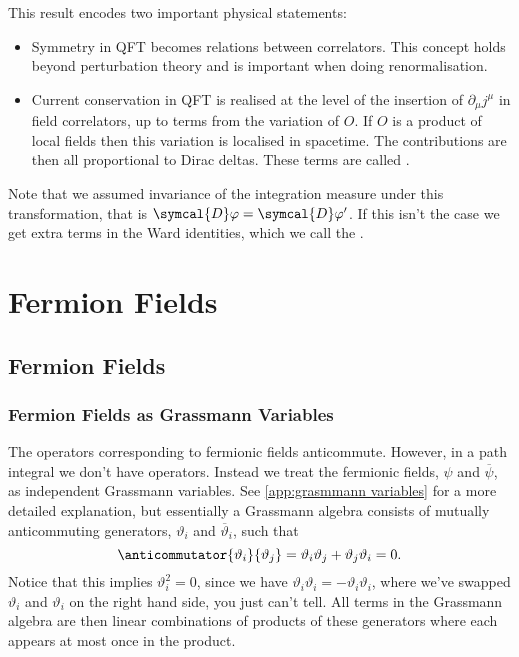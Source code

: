 \documentclass[fleqn]{NotesClass}
\newcommand{\DL}[1]{\symcal{D}#1}
\newcommand{\diracadjoint}[1]{\overbar{#1}}
\begin{document}
    This result encodes two important physical statements:
    \begin{itemize}
        \item Symmetry in QFT becomes relations between correlators. This concept holds beyond perturbation theory and is important when doing renormalisation.
        \item Current conservation in QFT is realised at the level of the insertion of \(\partial_\mu j^\mu\) in field correlators, up to terms from the variation of \(O\).
        If \(O\) is a product of local fields then this variation is localised in spacetime.
        The contributions are then all proportional to Dirac deltas.
        These terms are called .
    \end{itemize}
    Note that we assumed invariance of the integration measure under this transformation, that is \(\DL{\varphi} = \DL{\varphi'}\).
    If this isn't the case we get extra terms in the Ward identities, which we call the .
    
    \part{Fermion Fields}
    \chapter{Fermion Fields}
    \section{Fermion Fields as Grassmann Variables}
    The operators corresponding to fermionic fields anticommute.
    However, in a path integral we don't have operators.
    Instead we treat the fermionic fields, \(\psi\) and \(\diracadjoint{\psi}\), as independent Grassmann variables.
    See \cref{app:grasmmann variables} for a more detailed explanation, but essentially a Grassmann algebra consists of mutually anticommuting generators, \(\vartheta_i\) and \(\diracadjoint{\vartheta}_i\), such that
    \begin{equation}
        \anticommutator{\vartheta_i}{\vartheta_j} = \vartheta_i\vartheta_j + \vartheta_j\vartheta_i = 0.
    \end{equation}
    Notice that this implies \(\vartheta_i^2 = 0\), since we have \(\vartheta_i\vartheta_i = -\vartheta_i\vartheta_i\), where we've swapped \(\vartheta_i\) and \(\vartheta_i\) on the right hand side, you just can't tell.
    All terms in the Grassmann algebra are then linear combinations of products of these generators where each appears at most once in the product.
    
\end{document}
